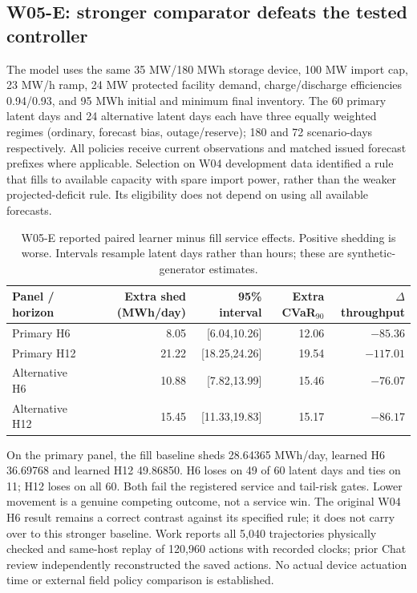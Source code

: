 \documentclass[11pt,letterpaper]{article}
\begin{document}
\subsection{W05-E: stronger comparator defeats the tested controller}
The model uses the same 35 MW/180 MWh storage device, 100 MW import cap, 23 MW/h ramp, 24 MW protected facility demand, charge/discharge efficiencies 0.94/0.93, and 95 MWh initial and minimum final inventory. The 60 primary latent days and 24 alternative latent days each have three equally weighted regimes (ordinary, forecast bias, outage/reserve); 180 and 72 scenario-days respectively. All policies receive current observations and matched issued forecast prefixes where applicable. Selection on W04 development data identified a rule that fills to available capacity with spare import power, rather than the weaker projected-deficit rule. Its eligibility does not depend on using all available forecasts.

\begin{table}[htbp]\centering\small
\caption{W05-E reported paired learner minus fill service effects. Positive shedding is worse. Intervals resample latent days rather than hours; these are synthetic-generator estimates.}
\begin{tabular}{lrrrr}\toprule
Panel / horizon & Extra shed (MWh/day) & 95\% interval & Extra CVaR$_{90}$ & $\Delta$ throughput\\\midrule
Primary H6 & 8.05 & [6.04,10.26] & 12.06 & $-85.36$\\
Primary H12 & 21.22 & [18.25,24.26] & 19.54 & $-117.01$\\
Alternative H6 & 10.88 & [7.82,13.99] & 15.46 & $-76.07$\\
Alternative H12 & 15.45 & [11.33,19.83] & 15.17 & $-86.17$\\\bottomrule
\end{tabular}
\end{table}
On the primary panel, the fill baseline sheds 28.64365 MWh/day, learned H6 36.69768 and learned H12 49.86850. H6 loses on 49 of 60 latent days and ties on 11; H12 loses on all 60. Both fail the registered service and tail-risk gates. Lower movement is a genuine competing outcome, not a service win. The original W04 H6 result remains a correct contrast against its specified rule; it does not carry over to this stronger baseline. Work reports all 5,040 trajectories physically checked and same-host replay of 120,960 actions with recorded clocks; prior Chat review independently reconstructed the saved actions. No actual device actuation time or external field policy comparison is established.
\end{document}

